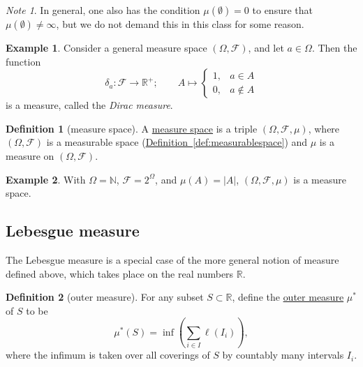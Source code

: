 \documentclass[a4paper]{scrartcl}
\newcommand{\R}{\mathbb{R}}
\newcommand{\N}{\mathbb{N}}
\newcommand{\defn}[1]{\ul{#1}}
\newcommand{\abs}[1]{\left|#1\right|}
\theoremstyle{definition}
\newtheorem{definition}{Definition}[section]
\newtheorem{example}{Example}[section]
\theoremstyle{plain}
\theoremstyle{remark}
\newtheorem{note}{Note}[section]
\begin{document}
\begin{note}
  In general, one also has the condition $\mu(\emptyset) = 0$ to ensure that $\mu( \emptyset ) \neq \infty$, but we do not demand this in this class for some reason.
\end{note}

\begin{example}
  \label{eg:diracmeasure}
  Consider a general measure space $(\Omega, \mathcal{F})$, and let $a \in \Omega$. Then the function
  \begin{equation*}
    \delta_{a}\colon \mathcal{F} \to \R^{+};\qquad A \mapsto
    \begin{cases}
      1, &a \in A \\
      0, &a \notin A
    \end{cases}
  \end{equation*}
  is a measure, called the \emph{Dirac measure}.
\end{example}

\begin{definition}[measure space]
  \label{def:measurespace}
  A \defn{measure space} is a triple $(\Omega, \mathcal{F}, \mu)$, where $(\Omega, \mathcal{F})$ is a measurable space (\hyperref[def:measurablespace]{Definition~\ref*{def:measurablespace}}) and $\mu$ is a measure on $(\Omega, \mathcal{F})$.
\end{definition}

\begin{example}
  \label{eg:discretemeasurespace}
  With $\Omega = \N$, $\mathcal{F} = 2^{\Omega}$, and $\mu(A) = \abs{A}$, $(\Omega, \mathcal{F}, \mu)$ is a measure space.
\end{example}

\subsection{Lebesgue measure}
The Lebesgue measure is a special case of the more general notion of measure defined above, which takes place on the real numbers $\R$.
\begin{definition}[outer measure]
  \label{def:outermeasure}
  For any subset $S \subset \R$, define the \defn{outer measure} $\mu^{*}$ of $S$ to be
  \begin{equation*}
    \mu^{*}(S) = \inf\left( \sum_{i \in I}\ell(I_{i}) \right),
  \end{equation*}
  where the infimum is taken over all coverings of $S$ by countably many intervals $I_{i}$.
\end{definition}
\end{document}
